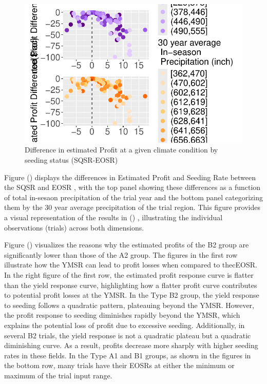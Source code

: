 \documentclass[
]{article}
\begin{document}
\begin{figure}[H]

{\centering \includegraphics[width=17.1875in,height=\textheight]{corn_seed_response_writing_files/figure-pdf/fig4-dif-pro-seed-comb-1.pdf}

}

\caption{Difference in estimated Profit at a given climate condition by
seeding status (SQSR-EOSR)}

\end{figure}%

Figure
()
displays the differences in Estimated Profit and Seeding Rate between
the SQSR and EOSR , with the top panel showing these differences as a
function of total in-sesaon precipitation of the trial year and the
bottom panel categorizing them by the 30 year average precipitation of
the trial region. This figure provides a visual representation of the
results in
()
, illustrating the individual observations (trials) across both
dimensions.

Figure ()
visualizes the reasons why the estimated profits of the B2 group are
significantly lower than those of the A2 group. The figures in the first
row illustrate how the YMSR can lead to profit losses when compared to
thecEOSR. In the right figure of the first row, the estimated profit
response curve is flatter than the yield response curve, highlighting
how a flatter profit curve contributes to potential profit losses at the
YMSR. In the Type B2 group, the yield response to seeding follows a
quadratic pattern, plateauing beyond the YMSR. However, the profit
response to seeding diminishes rapidly beyond the YMSR, which explains
the potential loss of profit due to excessive seeding. Additionally, in
several B2 trials, the yield response is not a quadratic plateau but a
quadratic diminishing curve. As a result, profits decrease more sharply
with higher seeding rates in these fields. In the Type A1 and B1 groups,
as shown in the figures in the bottom row, many trials have their EOSRs
at either the minimum or maximum of the trial input range.
\end{document}
